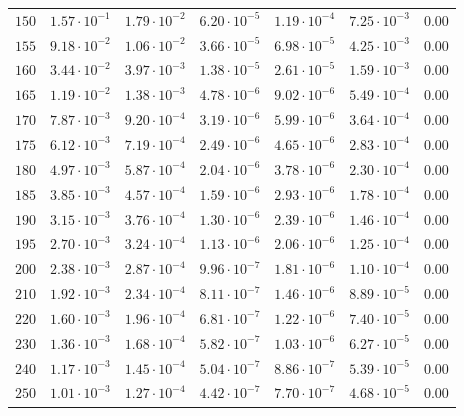 \begin{table}
\begin{tabular}{lcccccc}
$150 $&$ 1.57\cdot 10^{-1}  $&$ 1.79\cdot 10^{-2}  $&$ 6.20\cdot 10^{-5}  $&$ 1.19\cdot 10^{-4}  $&$ 7.25\cdot 10^{-3}  $&$ 0.00 $\\
$155 $&$ 9.18\cdot 10^{-2}  $&$ 1.06\cdot 10^{-2}  $&$ 3.66\cdot 10^{-5}  $&$ 6.98\cdot 10^{-5}  $&$ 4.25\cdot 10^{-3}  $&$ 0.00 $\\
$160 $&$ 3.44\cdot 10^{-2}  $&$ 3.97\cdot 10^{-3}  $&$ 1.38\cdot 10^{-5}  $&$ 2.61\cdot 10^{-5}  $&$ 1.59\cdot 10^{-3}  $&$ 0.00 $\\
$165 $&$ 1.19\cdot 10^{-2}  $&$ 1.38\cdot 10^{-3}  $&$ 4.78\cdot 10^{-6}  $&$ 9.02\cdot 10^{-6}  $&$ 5.49\cdot 10^{-4}  $&$ 0.00 $\\
$170 $&$ 7.87\cdot 10^{-3}  $&$ 9.20\cdot 10^{-4}  $&$ 3.19\cdot 10^{-6}  $&$ 5.99\cdot 10^{-6}  $&$ 3.64\cdot 10^{-4}  $&$ 0.00 $\\
$175 $&$ 6.12\cdot 10^{-3}  $&$ 7.19\cdot 10^{-4}  $&$ 2.49\cdot 10^{-6}  $&$ 4.65\cdot 10^{-6}  $&$ 2.83\cdot 10^{-4}  $&$ 0.00 $\\
$180 $&$ 4.97\cdot 10^{-3}  $&$ 5.87\cdot 10^{-4}  $&$ 2.04\cdot 10^{-6}  $&$ 3.78\cdot 10^{-6}  $&$ 2.30\cdot 10^{-4}  $&$ 0.00 $\\
$185 $&$ 3.85\cdot 10^{-3}  $&$ 4.57\cdot 10^{-4}  $&$ 1.59\cdot 10^{-6}  $&$ 2.93\cdot 10^{-6}  $&$ 1.78\cdot 10^{-4}  $&$ 0.00 $\\
$190 $&$ 3.15\cdot 10^{-3}  $&$ 3.76\cdot 10^{-4}  $&$ 1.30\cdot 10^{-6}  $&$ 2.39\cdot 10^{-6}  $&$ 1.46\cdot 10^{-4}  $&$ 0.00 $\\
$195 $&$ 2.70\cdot 10^{-3}  $&$ 3.24\cdot 10^{-4}  $&$ 1.13\cdot 10^{-6}  $&$ 2.06\cdot 10^{-6}  $&$ 1.25\cdot 10^{-4}  $&$ 0.00 $\\
$200 $&$ 2.38\cdot 10^{-3}  $&$ 2.87\cdot 10^{-4}  $&$ 9.96\cdot 10^{-7}  $&$ 1.81\cdot 10^{-6}  $&$ 1.10\cdot 10^{-4}  $&$ 0.00 $\\
$210 $&$ 1.92\cdot 10^{-3}  $&$ 2.34\cdot 10^{-4}  $&$ 8.11\cdot 10^{-7}  $&$ 1.46\cdot 10^{-6}  $&$ 8.89\cdot 10^{-5}  $&$ 0.00 $\\
$220 $&$ 1.60\cdot 10^{-3}  $&$ 1.96\cdot 10^{-4}  $&$ 6.81\cdot 10^{-7}  $&$ 1.22\cdot 10^{-6}  $&$ 7.40\cdot 10^{-5}  $&$ 0.00 $\\
$230 $&$ 1.36\cdot 10^{-3}  $&$ 1.68\cdot 10^{-4}  $&$ 5.82\cdot 10^{-7}  $&$ 1.03\cdot 10^{-6}  $&$ 6.27\cdot 10^{-5}  $&$ 0.00 $\\
$240 $&$ 1.17\cdot 10^{-3}  $&$ 1.45\cdot 10^{-4}  $&$ 5.04\cdot 10^{-7}  $&$ 8.86\cdot 10^{-7}  $&$ 5.39\cdot 10^{-5}  $&$ 0.00 $\\
$250 $&$ 1.01\cdot 10^{-3}  $&$ 1.27\cdot 10^{-4}  $&$ 4.42\cdot 10^{-7}  $&$ 7.70\cdot 10^{-7}  $&$ 4.68\cdot 10^{-5}  $&$ 0.00 $\\

\end{tabular}
\end{table}
